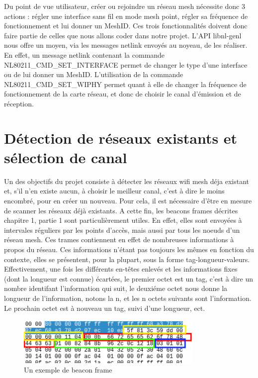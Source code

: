 Du point de vue utilisateur, créer ou rejoindre  un réseau mesh nécessite donc 3 actions : régler une interface sans fil en mode mesh
point, régler sa fréquence de fonctionnement et lui donner un MeshID. Ces trois fonctionnalités doivent donc faire partie de celles que
nous allons coder dans notre projet. L'API libnl-genl nous offre un moyen, via les messages netlink envoyés au noyeau, de les réaliser.
En effet, un message netlink contenant la commande NL80211\_\-CMD\_\-SET\_\-INTERFACE permet de changer le type d'une interface ou de lui 
donner un MeshID. L'utilisation de la commande NL80211\_\-CMD\_\-SET\_\-WIPHY permet quant à elle de changer la fréquence de 
fonctionnement de la carte réseau, et donc de choisir le canal d'émission et de réception.

\section{Détection de réseaux existants et sélection de canal}

Un des objectifs du projet consiste à détecter les réseaux wifi mesh déja existant et, s'il n'en existe aucun, à choisir le
meilleur canal, c'est à dire le moins encombré, pour en créer un nouveau. Pour cela, il est nécessaire d'être en mesure de scanner
les réseaux déjà existants. A cette fin, les beacons frames décrites chapitre 1, partie 1 sont particulièrement utiles. En effet,
elles sont envoyées à intervales réguliers par les points d'accès, mais aussi par tous les noeuds d'un réseau mesh. Ces trames 
contiennent en effet de nombreuses informations à propos du réseau. Ces informations n'étant pas toujours les mêmes en fonction du 
contexte, elles se présentent, pour la plupart, sous la forme tag-longueur-valeurs. Effectivement, une fois les différents en-têtes 
enlevés et les informations fixes (dont la longueur est connue) écartées, le premier octet est un tag, c'est à dire un nombre 
identifant l'information qui suit, le deuxiéme octet nous donne la longueur de l'information, notons la n, et les n octets suivants
sont l'information. Le prochain octet est à nouveau un tag, suivi d'une longueur, ect.

\begin{figure}
   \centering
   \includegraphics[width=0.8\textwidth,natwidth=610,natheight=642]{images/beacon_frame.png}
   \caption{Un exemple de beacon frame}
\end{figure}

